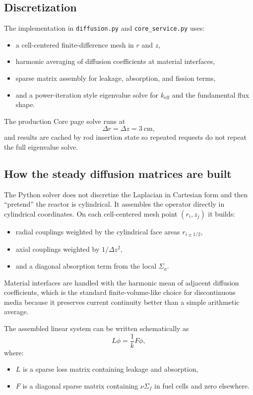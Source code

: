 \documentclass[11pt]{article}
\begin{document}
\subsection{Discretization}

The implementation in \texttt{diffusion.py} and \texttt{core\_service.py} uses:
\begin{itemize}
  \item a cell-centered finite-difference mesh in $r$ and $z$,
  \item harmonic averaging of diffusion coefficients at material interfaces,
  \item sparse matrix assembly for leakage, absorption, and fission terms,
  \item and a power-iteration style eigenvalue solve for $k_{\mathrm{eff}}$ and
        the fundamental flux shape.
\end{itemize}

The production Core page solve runs at
\[
\Delta r = \Delta z = 3\ \mathrm{cm},
\]
and results are cached by rod insertion state so repeated requests do not repeat
the full eigenvalue solve.

\subsection{How the steady diffusion matrices are built}

The Python solver does not discretize the Laplacian in Cartesian form and then
``pretend'' the reactor is cylindrical.  It assembles the operator directly in
cylindrical coordinates.  On each cell-centered mesh point $(r_i,z_j)$ it builds:
\begin{itemize}
  \item radial couplings weighted by the cylindrical face areas $r_{i\pm 1/2}$,
  \item axial couplings weighted by $1/\Delta z^2$,
  \item and a diagonal absorption term from the local $\Sigma_a$.
\end{itemize}

Material interfaces are handled with the harmonic mean of adjacent diffusion
coefficients, which is the standard finite-volume-like choice for discontinuous
media because it preserves current continuity better than a simple arithmetic
average.

The assembled linear system can be written schematically as
\[
L\phi = \frac{1}{k}F\phi,
\]
where:
\begin{itemize}
  \item $L$ is a sparse loss matrix containing leakage and absorption,
  \item $F$ is a diagonal sparse matrix containing $\nu\Sigma_f$ in fuel cells
        and zero elsewhere.
\end{itemize}
\end{document}
